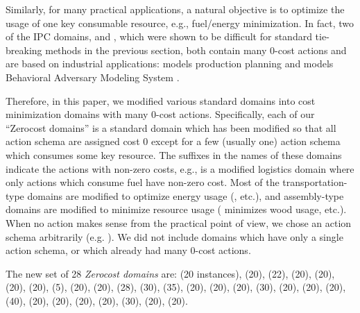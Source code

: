 Similarly, for many practical applications, a natural objective is to
optimize the usage of one key consumable resource, e.g., fuel/energy
minimization.  In fact, two of the IPC domains,  and
, which were shown to be difficult for standard tie-breaking
methods in the previous section, both contain many 0-cost actions
and are based on industrial applications: %
 models
production planning \cite{fink1999applications} and 
models Behavioral Adversary Modeling System \cite[minimizing decryption,
data transfer, etc.]{boddy2005course}.

Therefore, %
in this paper, we modified various standard domains
into cost minimization domains with many 0-cost actions.
Specifically, each of our ``Zerocost domains'' is a standard domain which has been modified so that all action schema are assigned
cost 0 except for a few (usually one) action schema which consumes some key resource.
The suffixes in the names of these domains indicate the actions with non-zero costs, 
e.g.,  is a modified logistics domain where only actions which consume fuel have non-zero cost.
Most of the transportation-type domains are modified to optimize 
energy usage (,  etc.), and  assembly-type domains are modified to minimize resource usage
( minimizes wood usage, etc.).
When no action makes sense from the practical point of view, we chose an action schema arbitrarily (e.g. ).
We did not
include domains which have only a single action schema, or which already had many 0-cost actions.

The new set of 28 \emph{Zerocost domains} are:
 (20 instances),  (20),  (22),  (20),
 (20),  (20),  (20),  (5),
 (20),  (20),  (28),  (30),
 (35),  (20),  (20),
 (20),  (30),  (20),
 (20),  (20),  (40),
 (20),  (20),  (20),
 (20),  (30),  (20),
 (20).


